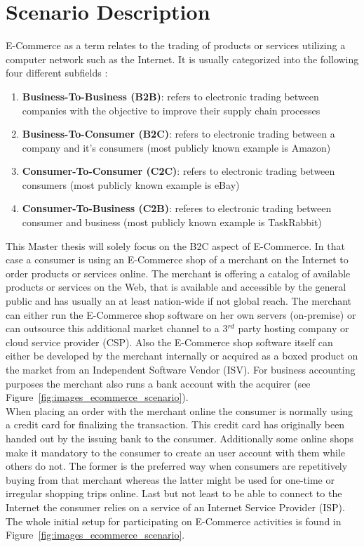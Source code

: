 
\section{Scenario Description}
\label{sec:scenario_description}

E-Commerce as a term relates to the trading of products or services utilizing a computer network such as the Internet. It is usually categorized into the following four different subfields \citep{sen2015study}:\@

\begin{enumerate}
  \item \textbf{Business-To-Business (B2B)}: refers to electronic trading between companies with the objective to improve their supply chain processes
  \item \textbf{Business-To-Consumer (B2C)}: refers to electronic trading between a company and it's consumers (most publicly known example is Amazon)
  \item \textbf{Consumer-To-Consumer (C2C)}: refers to electronic trading between consumers (most publicly known example is eBay)
  \item \textbf{Consumer-To-Business (C2B)}: referes to electronic trading between consumer and business (most publicly known example is TaskRabbit)
\end{enumerate}

This Master thesis will solely focus on the B2C aspect of E-Commerce. In that case a consumer is using an E-Commerce shop of a merchant on the Internet to order products or services online. The merchant is offering a catalog of available products or services on the Web, that is available and accessible by the general public and has usually an at least nation-wide if not global reach. The merchant can either run the E-Commerce shop software on her own servers (on-premise) or can outsource this additional market channel to a 3$^{rd}$ party hosting company or cloud service provider (CSP). Also the E-Commerce shop software itself can either be developed by the merchant internally or acquired as a boxed product on the market from an Independent Software Vendor (ISV). For business accounting purposes the merchant also runs a bank account with the acquirer (see Figure~\ref{fig:images_ecommerce_scenario}). \\
When placing an order with the merchant online the consumer is normally using a credit card for finalizing the transaction. This credit card has originally been handed out by the issuing bank to the consumer. Additionally some online shops make it mandatory to the consumer to create an user account with them while others do not. The former is the preferred way when consumers are repetitively buying from that merchant whereas the latter might be used for one-time or irregular shopping trips online. Last but not least to be able to connect to the Internet the consumer relies on a service of an Internet Service Provider (ISP). The whole initial setup for participating on E-Commerce activities is found in Figure~\ref{fig:images_ecommerce_scenario}.\@

